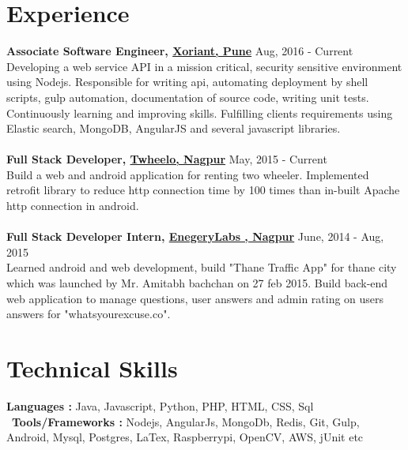 \documentclass[margin, centered]{res}
\begin{document}
\begin{resume}
\begin{itemize}[leftmargin=*]
\end{itemize}
 
\section{Experience}
\textbf{Associate Software Engineer, \href{http://www.xoriant.com}{Xoriant, Pune}} \hfill Aug, 2016 - Current\\
Developing a web service API in a mission critical, security sensitive environment using Nodejs. Responsible for writing api, automating deployment by shell scripts, gulp automation, documentation of source code, writing unit tests. Continuously learning and improving skills. Fulfilling clients requirements using Elastic search, MongoDB, AngularJS and several javascript libraries.
\\
\\
\textbf{Full Stack Developer, \href{http://www.twheelo.com}{Twheelo, Nagpur}} \hfill May, 2015 - Current\\
Build a web and android application for renting two wheeler. Implemented retrofit library to reduce http connection time by 100 times than in-built Apache http connection in android. 
\\
\\
\textbf{Full Stack Developer Intern, \href{http://www.energylabs.in/}{EnegeryLabs , Nagpur}}
 \hfill June, 2014 - Aug, 2015 \\ 
Learned android and web development, build "Thane Traffic App" for thane city which was launched by Mr. Amitabh bachchan on 27 feb 2015. 
Build back-end web application to manage questions, user answers and admin rating on users answers 
for "whatsyourexcuse.co".
\

\section{Technical Skills}
\textbf{Languages : }
	Java, Javascript, Python, PHP, HTML, CSS, Sql \\
\
\textbf{Tools/Frameworks : }
Nodejs, AngularJs, MongoDb, Redis, Git, Gulp, Android, Mysql, Postgres, LaTex, Raspberrypi, OpenCV, AWS, jUnit etc
\	
	

\end{resume}
\end{document}
